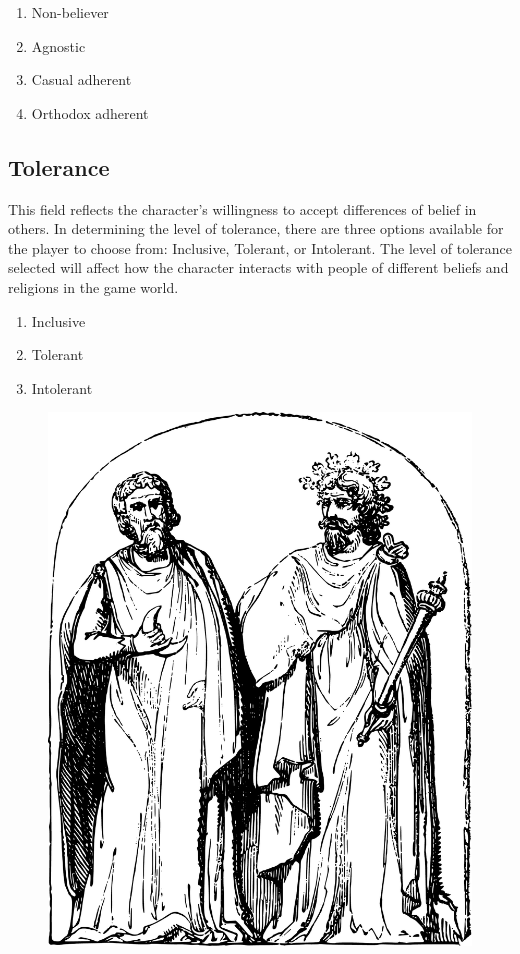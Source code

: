 \documentclass[12pt]{book}
\begin{document}
\begin{enumerate}
    \item Non-believer
    \item Agnostic
    \item Casual adherent
    \item Orthodox adherent
\end{enumerate}

\subsection{\textbf{Tolerance}}

This field reflects the character's willingness to accept differences of belief in others. In determining the level of tolerance, there are three options available for the player to choose from: Inclusive, Tolerant, or Intolerant. The level of tolerance selected will affect how the character interacts with people of different beliefs and religions in the game world.

\begin{enumerate}
    \item Inclusive
    \item Tolerant
    \item Intolerant
\end{enumerate}

\begin{figure}[h]
    \centering
    \includegraphics[width=\textwidth]{./images/religion03.pdf}
\end{figure}
\end{document}
